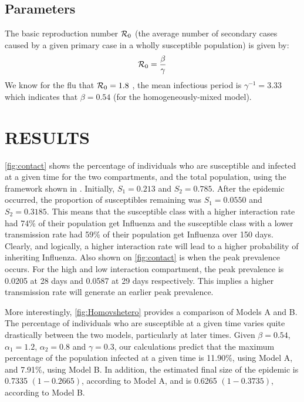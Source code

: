 \documentclass[a4paper, 12pt, journal]{ieeeconf}\usepackage[]{graphicx}\usepackage[]{color}
\begin{document}
\subsection{Parameters}

The basic reproduction number $\R_0$ (the average number of secondary cases caused by a given primary case in a wholly susceptible population) is given by:
\begin{equation}\label{eq:Ro}
\R_0=\frac{\beta}{\gamma}
\end{equation}
We know for the flu that $\R_0 = 1.8$ \cite{reproductiveno.influenza}, the mean infectious period is $\gamma^{-1} = 3.33$ \cite{reproductiveno.influenza} which indicates that 
$\beta = 0.54$ (for the homogeneously-mixed model).

\section{RESULTS}

\ref{fig:contact} shows the percentage of individuals who are susceptible and infected at a given time for the two compartments, and the total population, using the framework shown in . Initially, $S_1 = 0.213$ and $S_2 = 0.785$. After the epidemic occurred, the proportion of susceptibles remaining was $S_1 = 0.0550$ and $S_2 = 0.3185$. This means that the susceptible class with a higher interaction rate had 74\% of their population get Influenza and the susceptible class with a lower transmission rate had 59\% of their population get Influenza over 150 days. Clearly, and logically, a higher interaction rate will lead to a higher probability of inheriting Influenza. Also shown on \ref{fig:contact} is when the peak prevalence occurs. For the high and low interaction compartment, the peak prevalence is 0.0205 at 28 days and 0.0587 at 29 days respectively. This implies a higher transmission rate will generate an earlier peak prevalence. 

More interestingly, \ref{fig:Homovshetero} provides a comparison of Models A and B. The percentage of individuals who are susceptible at a given time varies quite drastically between the two models, particularly at later times. Given $\beta = 0.54$, $\alpha_1 = 1.2$, $\alpha_2 = 0.8$ and $\gamma = 0.3$, our calculations predict that the maximum percentage of the population infected at a given time is 11.90\%, using Model A, and 7.91\%, using Model B. In addition, the estimated final size of the epidemic is 0.7335 $(1-0.2665)$, according to Model A, and is 0.6265 $(1 - 0.3735)$, according to Model B. 
\end{document}
